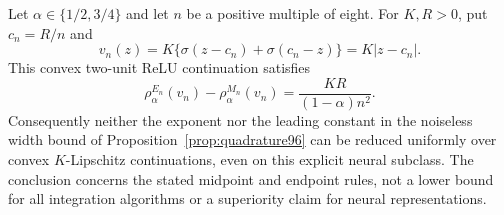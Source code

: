 \begin{corollary}\label{cor:sharpness96}
Let $\alpha\in\{1/2,3/4\}$ and let $n$ be a positive multiple of eight. For $K,R>0$, put $c_n=R/n$ and
\[
 v_n(z)=K\{\sigma(z-c_n)+\sigma(c_n-z)\}=K|z-c_n|.
\]
This convex two-unit ReLU continuation satisfies
\[
 \rho_\alpha^{E_n}(v_n)-\rho_\alpha^{M_n}(v_n)
       =\frac{KR}{(1-\alpha)n^2}.
\]
Consequently neither the exponent nor the leading constant in the noiseless width bound of Proposition~\ref{prop:quadrature96} can be reduced uniformly over convex $K$-Lipschitz continuations, even on this explicit neural subclass. The conclusion concerns the stated midpoint and endpoint rules, not a lower bound for all integration algorithms or a superiority claim for neural representations.
\end{corollary}
